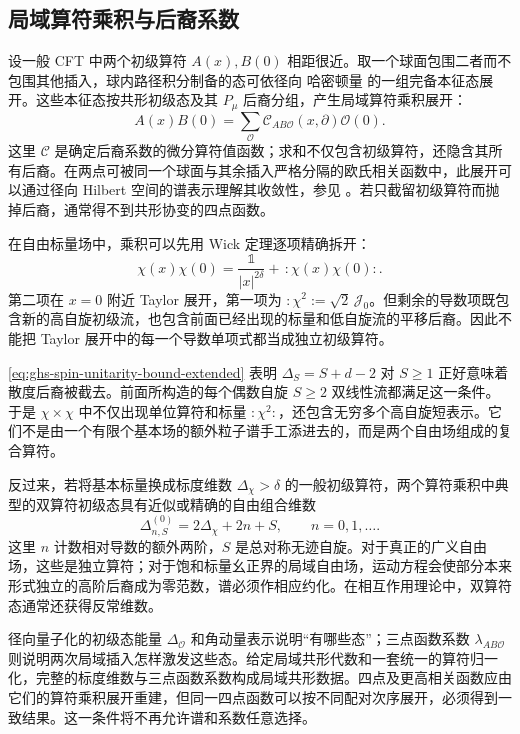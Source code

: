 \subsection{局域算符乘积与后裔系数}

设一般 CFT 中两个初级算符 $A(x),B(0)$ 相距很近。取一个球面包围二者而不包围其他插入，球内路径积分制备的态可依径向 哈密顿量 的一组完备本征态展开。这些本征态按共形初级态及其 $P_\mu$ 后裔分组，产生局域算符乘积展开：
\begin{equation}\label{eq:ghs-ope-general}
 A(x)B(0)=\sum_{\mathcal O}\mathcal C_{AB\mathcal O}(x,\partial)
 \mathcal O(0).
\end{equation}
这里 $\mathcal C$ 是确定后裔系数的微分算符值函数；求和不仅包含初级算符，还隐含其所有后裔。在两点可被同一个球面与其余插入严格分隔的欧氏相关函数中，此展开可以通过径向 Hilbert 空间的谱表示理解其收敛性，参见 \cite{ghs-rychkov,ghs-simmons}。若只截留初级算符而抛掉后裔，通常得不到共形协变的四点函数。

在自由标量场中，乘积可以先用 Wick 定理逐项精确拆开：
\begin{equation}\label{eq:ghs-free-field-ope-start}
 \chi(x)\chi(0)=\frac{\mathds1}{|x|^{2\delta}}+\, :\!\chi(x)\chi(0)\!:.
\end{equation}
第二项在 $x=0$ 附近 Taylor 展开，第一项为 $:\!\chi^2\!:=\sqrt2\,\mathscr J_0$。但剩余的导数项既包含新的高自旋初级流，也包含前面已经出现的标量和低自旋流的平移后裔。因此不能把 Taylor 展开中的每一个导数单项式都当成独立初级算符。


\cref{eq:ghs-spin-unitarity-bound-extended} 表明 $\Delta_S=S+d-2$ 对 $S\ge1$ 正好意味着散度后裔被截去。前面所构造的每个偶数自旋 $S\ge2$ 双线性流都满足这一条件。于是 $\chi\times\chi$ 中不仅出现单位算符和标量 $:\!\chi^2\!:$，还包含无穷多个高自旋短表示。它们不是由一个有限个基本场的额外粒子谱手工添进去的，而是两个自由场组成的复合算符。

反过来，若将基本标量换成标度维数 $\Delta_\chi>\delta$ 的一般初级算符，两个算符乘积中典型的双算符初级态具有近似或精确的自由组合维数
\begin{equation}\label{eq:ghs-doubletwist-kinematic-dimension}
 \Delta_{n,S}^{(0)}=2\Delta_\chi+2n+S,
 \qquad n=0,1,\ldots .
\end{equation}
这里 $n$ 计数相对导数的额外两阶，$S$ 是总对称无迹自旋。对于真正的广义自由场，这些是独立算符；对于饱和标量幺正界的局域自由场，运动方程会使部分本来形式独立的高阶后裔成为零范数，谱必须作相应约化。在相互作用理论中，双算符态通常还获得反常维数。


径向量子化的初级态能量 $\Delta_{\mathcal O}$ 和角动量表示说明“有哪些态”；三点函数系数 $\lambda_{AB\mathcal O}$ 则说明两次局域插入怎样激发这些态。给定局域共形代数和一套统一的算符归一化，完整的标度维数与三点函数系数构成局域共形数据。四点及更高相关函数应由它们的算符乘积展开重建，但同一四点函数可以按不同配对次序展开，必须得到一致结果。这一条件将不再允许谱和系数任意选择。


